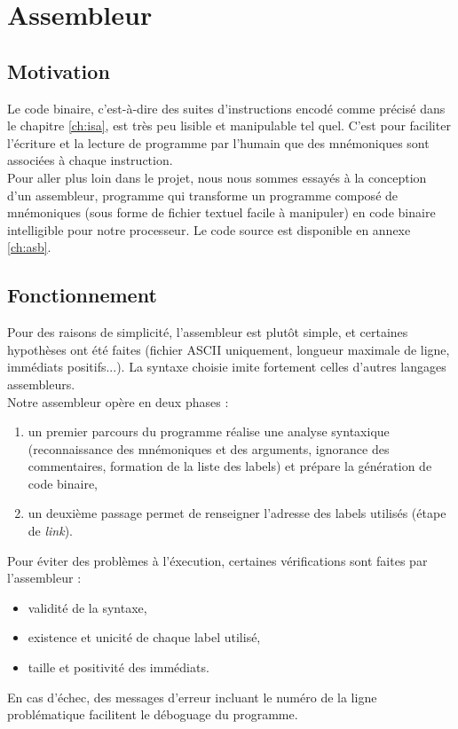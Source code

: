 \chapter{Assembleur}
\label{ch:assembleur}

\section{Motivation}

Le code binaire, c'est-à-dire des suites d'instructions encodé comme précisé
dans le chapitre \ref{ch:isa}, est très peu lisible et manipulable tel quel.
C'est pour faciliter l'écriture et la lecture de programme par l'humain que des
mnémoniques sont associées à chaque instruction. \\

Pour aller plus loin dans le projet, nous nous sommes essayés à la conception
d'un assembleur, programme qui transforme un programme composé de mnémoniques
(sous forme de fichier textuel facile à manipuler) en code binaire
intelligible pour notre processeur. Le code source est disponible en annexe
\ref{ch:asb}.

\section{Fonctionnement}

Pour des raisons de simplicité, l'assembleur est plutôt simple, et certaines
hypothèses ont été faites (fichier ASCII uniquement, longueur maximale de
ligne, immédiats positifs...). La syntaxe choisie imite fortement celles
d'autres langages assembleurs. \\

Notre assembleur opère en deux phases :
\begin{enumerate}
\item un premier parcours du programme réalise une analyse syntaxique
    (reconnaissance des mnémoniques et des arguments, ignorance des
    commentaires, formation de la liste des labels) et prépare la génération de
    code binaire,
\item un deuxième passage permet de renseigner l'adresse des labels utilisés
    (étape de \textit{link}). \\
\end{enumerate}

Pour éviter des problèmes à l'éxecution, certaines vérifications sont faites
par l'assembleur :
\begin{itemize}
\item validité de la syntaxe,
\item existence et unicité de chaque label utilisé,
\item taille et positivité des immédiats.
\end{itemize}
En cas d'échec, des messages d'erreur incluant le numéro de la ligne
problématique facilitent le déboguage du programme.

